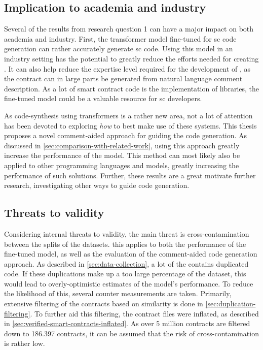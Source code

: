 \subsection{Implication to academia and industry}
\label{sec:rq1-implication-to-academia-and-industry}
Several of the results from research question 1 can have a major impact on both academia and industry. First, the transformer model fine-tuned for \acrshort{sc} code generation can rather accurately generate \acrshort{sc} code. Using this model in an industry setting has the potential to greatly reduce the efforts needed for creating . It can also help reduce the expertise level required for the development of , as the contract can in large parts be generated from natural language comment description. As a lot of smart contract code is the implementation of libraries, the fine-tuned model could be a valuable resource for \acrshort{sc} developers.

As code-synthesis using transformers is a rather new area, not a lot of attention has been devoted to exploring \textit{how} to best make use of these systems. This thesis proposes a novel comment-aided approach for guiding the code generation. As discussed in \cref{sec:comparison-with-related-work}, using this approach greatly increase the performance of the model. This method can most likely also be applied to other programming languages and models,  greatly increasing the performance of such solutions. Further, these results are a great motivate further research, investigating other ways to guide code generation.

\subsection{Threats to validity}
\label{sec:rq1-threats-to-validity}

Considering internal threats to validity, the main threat is cross-contamination between the splits of the datasets. this applies to both the performance of the fine-tuned model, as well as the evaluation of the comment-aided code generation approach. As described in \cref{sec:data-collection}, a lot of the  contains duplicated code. If these duplications make up a too large percentage of the dataset, this would lead to overly-optimistic estimates of the model's performance. To reduce the likelihood of this, several counter measurements are taken. Primarily, extensive filtering of the contracts based on similarity is done in \cref{sec:duplication-filtering}. To further aid this filtering, the contract files were inflated, as described in \cref{sec:verified-smart-contracts-inflated}. As over 5 million contracts are filtered down to 186.397 contracts, it can be assumed that the risk of cross-contamination is rather low.

